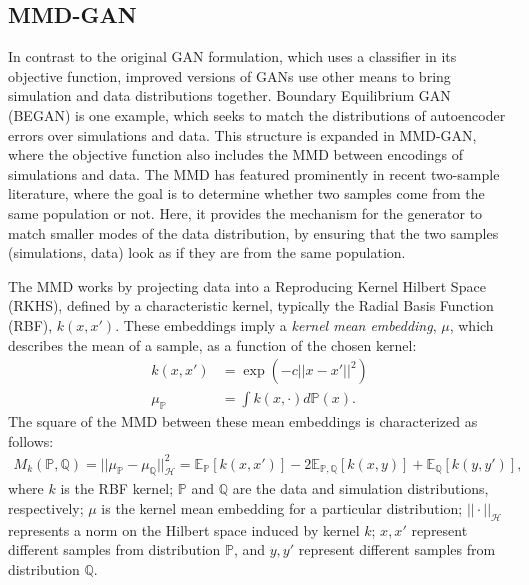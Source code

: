 \subsection{MMD-GAN}
In contrast to the original GAN formulation, which uses a classifier in its objective function, improved versions of GANs use other means to bring simulation and data distributions together. Boundary Equilibrium GAN (BEGAN) is one example, which seeks to match the distributions of autoencoder errors over simulations and data. This structure is expanded in MMD-GAN, where the objective function also includes the MMD between encodings of simulations and data. The MMD has featured prominently in recent two-sample literature, where the goal is to determine whether two samples come from the same population or not. Here, it provides the mechanism for the generator to match smaller modes of the data distribution, by ensuring that the two samples (simulations, data) look as if they are from the same population.

The MMD works by projecting data into a Reproducing Kernel Hilbert Space (RKHS), defined by a characteristic kernel, typically the Radial Basis Function (RBF), $k(x, x')$. These embeddings imply a \textit{kernel mean embedding}, $\mu$, which describes the mean of a sample, as a function of the chosen kernel:
\begin{align}
k(x, x') &= \exp (-c||x - x'||^2) \label{rbf}\\
\mu_\mathbb{P} &= \int k(x,\cdot) d\mathbb{P}(x).
\end{align} 
The square of the MMD between these mean embeddings is characterized as follows:
\begin{align}
M_k(\mathbb{P}, \mathbb{Q}) = ||\mu_{\mathbb{P}} - \mu_{\mathbb{Q}}||^2_\mathcal{H} = \mathbb{E}_\mathbb{P}[k(x,x')] - 2 \mathbb{E}_{\mathbb{P}, \mathbb{Q}}[k(x,y)] + \mathbb{E}_{\mathbb{Q}}[k(y,y')],
\end{align}
where $k$ is the RBF kernel; $\mathbb{P}$ and $\mathbb{Q}$ are the data and simulation distributions, respectively; $\mu$ is the kernel mean embedding for a particular distribution; $||\cdot||_{\mathcal{H}}$ represents a norm on the Hilbert space induced by kernel $k$; $x, x'$ represent different samples from distribution $\mathbb{P}$, and $y, y'$ represent different samples from distribution $\mathbb{Q}$.

